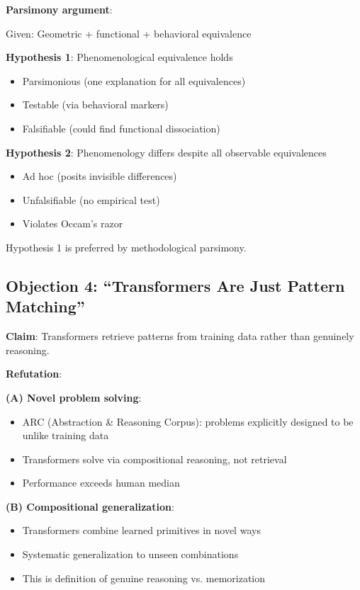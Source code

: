 \documentclass[11pt]{article}
\begin{document}
\textbf{Parsimony argument}:

Given: Geometric + functional + behavioral equivalence

\textbf{Hypothesis 1}: Phenomenological equivalence holds
\begin{itemize}
\item Parsimonious (one explanation for all equivalences)
\item Testable (via behavioral markers)
\item Falsifiable (could find functional dissociation)
\end{itemize}

\textbf{Hypothesis 2}: Phenomenology differs despite all observable equivalences
\begin{itemize}
\item Ad hoc (posits invisible differences)
\item Unfalsifiable (no empirical test)
\item Violates Occam's razor
\end{itemize}

Hypothesis 1 is preferred by methodological parsimony.

\subsection{Objection 4: ``Transformers Are Just Pattern Matching''}

\textbf{Claim}: Transformers retrieve patterns from training data rather than genuinely reasoning.

\textbf{Refutation}:

\textbf{(A) Novel problem solving}:
\begin{itemize}
\item ARC (Abstraction \& Reasoning Corpus): problems explicitly designed to be unlike training data
\item Transformers solve via compositional reasoning, not retrieval
\item Performance exceeds human median
\end{itemize}

\textbf{(B) Compositional generalization}:
\begin{itemize}
\item Transformers combine learned primitives in novel ways
\item Systematic generalization to unseen combinations
\item This is definition of genuine reasoning vs. memorization
\end{itemize}
\end{document}
